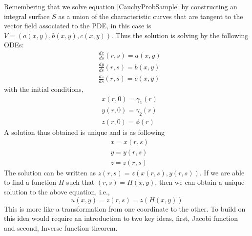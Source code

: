 \documentclass[11pt, a4paper]{report}
\begin{document}
Remembering that we solve equation \eqref{CauchyProbSample} by constructing an integral surface $S$ as a union
of the characteristic curves that are tangent to the vector field associated to the PDE, in this case is 
$V = (a(x, y), b(x, y), c(x, y))$. Thus the solution is solving by the following ODEs:
\begin{equation*}
    \begin{aligned}
        & \frac {dx}{ds}(r, s) = a(x, y)\\
        & \frac {dy}{ds}(r, s) = b(x, y)\\
        & \frac {dz}{ds}(r, s) = c(x, y)
    \end{aligned}
\end{equation*}
 with the initial conditions, 
\begin{equation*}
    \begin{aligned}
        & x(r, 0) = \gamma_{1}(r)\\[-0.5em]
        & y(r, 0) = \gamma_{2}(r)\\[-0.5em]
        & z(r, 0) = \phi(r)
    \end{aligned}
\end{equation*}
A solution thus obtained is unique and is as following
\begin{equation*}
    \begin{aligned}
        & x = x(r, s)\\[-0.5em]
        & y = y(r, s)\\[-0.5em]
        & z = z(r, s)
    \end{aligned}
\end{equation*}
The solution can be written as $z(r, s) = z(x(r, s), y(r, s))$. If we are able to find a function $H$ such that
$(r, s) = H(x, y)$, then we can obtain a unique solution to the above equation, i.e.,
\begin{equation*}
    u(x, y) = z(r, s) = z(H(x, y))
\end{equation*} 
This is more like a transformation from one coordinate to the other. To build on this idea would require an
introduction to two key ideas, first, Jacobi function and second, Inverse function theorem. 
\end{document}
